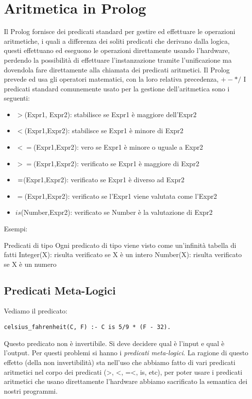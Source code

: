 \documentclass[a4paper]{report}
\begin{document}
\section{Aritmetica in Prolog}
Il Prolog fornisce dei predicati standard per gestire ed effettuare le operazioni aritmetiche, i quali a differenza dei soliti predicati
che derivano dalla logica, questi effettuano ed eseguono le operazioni direttamente usando l’hardware, perdendo la possibilità di effettuare
l’instanzazione tramite l’unificazione ma dovendola fare direttamente alla chiamata dei predicati aritmetici.
Il Prolog prevede ed usa gli operatori matematici, con la loro relativa precedenza, $+ - * /$ 
I predicati standard comunemente usato per la gestione dell’aritmetica sono i seguenti:
\begin{itemize}
    \item $>$(Expr1, Expr2): stabilisce se Expr1 è maggiore dell’Expr2
    \item $<$(Expr1,Expr2): stabilisce se Expr1 è minore di Expr2
    \item $<=$(Expr1,Expr2): vero se Expr1 è minore o uguale a Expr2
    \item $>=$(Expr1,Expr2): verificato se Expr1 è maggiore di Expr2
    \item $\\=$(Expr1,Expr2): verificato se Expr1 è diverso ad Expr2
    \item $=$(Expr1,Expr2): verificato se l’Expr1 viene valutata come l’Expr2
    \item $is$(Number,Expr2): verificato se Number è la valutazione di Expr2
\end{itemize}
Esempi:




Predicati di tipo
Ogni predicato di tipo viene visto come un’infinità tabella di fatti 
Integer(X): risulta verificato se X è un intero
Number(X): risulta verificato se X è un numero


\subsection{Predicati Meta-Logici}
Vediamo il predicato:
\begin{verbatim}
celsius_fahrenheit(C, F) :- C is 5/9 * (F - 32).
\end{verbatim}
Questo predicato non è invertibile. Si deve decidere qual è l'input e qual è l'output. Per questi problemi si hanno i \textit{predicati meta-logici}. La ragione di questo effetto (della non invertibilità) sta nell'uso che abbiamo fatto di vari predicati aritmetici nel corpo dei predicati (>, <, =<, is, etc), per poter usare i predicati aritmetici che usano direttamente l'hardware abbiamo sacrificato la semantica dei
nostri programmi.
\end{document}
